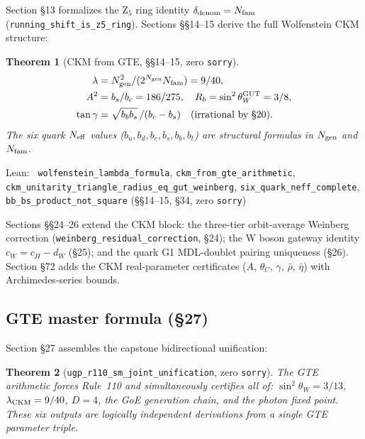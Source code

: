 \documentclass[11pt,a4paper]{article}
\newenvironment{leanref}%
  {\par\smallskip\noindent\begingroup\raggedright\textup{Lean:}~}%
  {\par\endgroup}
\newtheorem{theorem}{Theorem}[section]
\theoremstyle{definition}
\begin{document}
Section §13 formalizes the Z$_5$ ring identity $\delta_{\rm denom} = N_{\rm fam}$
(\lstinline|running_shift_is_z5_ring|).  Sections §§14--15 derive the full Wolfenstein
CKM structure:

\begin{theorem}[CKM from GTE, §§14--15, zero \texttt{sorry}]
\begin{align*}
\lambda &= N_{\rm gen}^2 / (2^{N_{\rm gen}} N_{\rm fam}) = 9/40, \\
A^2 &= b_s / b_c = 186/275, \quad
R_b = \sin^2\theta_W^{\rm GUT} = 3/8, \\
\tan\gamma &= \sqrt{b_b b_s}\, /(b_c - b_s) \quad\text{(irrational by §20)}.
\end{align*}
The six quark $N_{\rm eff}$ values ($b_u, b_d, b_c, b_s, b_b, b_t$) are structural
formulas in $N_{\rm gen}$ and $N_{\rm fam}$.
\end{theorem}

\begin{leanref}
\lstinline|wolfenstein_lambda_formula|, \lstinline|ckm_from_gte_arithmetic|,
\lstinline|ckm_unitarity_triangle_radius_eq_gut_weinberg|, \lstinline|six_quark_neff_complete|,
\lstinline|bb_bs_product_not_square| \textup{(§§14–15, §34, zero \texttt{sorry})}
\end{leanref}

Sections §§24--26 extend the CKM block: the three-tier orbit-average Weinberg correction
(\lstinline|weinberg_residual_correction|, §24); the W boson gateway identity
$c_W = c_H - d_W$ (§25); and the quark G1 MDL-doublet pairing uniqueness (§26).
Section §72 adds the CKM real-parameter certificates ($A$, $\theta_C$, $\gamma$,
$\bar\rho$, $\bar\eta$) with Archimedes-series bounds.

\subsection{GTE master formula (§27)}\label{subsec:gut-master}

Section §27 assembles the capstone bidirectional unification:

\begin{theorem}[\lstinline|ugp_r110_sm_joint_unification|, zero \texttt{sorry}]
The GTE arithmetic forces Rule~110 and simultaneously certifies all of: $\sin^2\theta_W
= 3/13$, $\lambda_{\rm CKM} = 9/40$, $D = 4$, the GoE generation chain, and the
photon fixed point.  These six outputs are logically independent derivations from a
single GTE parameter triple.
\end{theorem}
\end{document}
